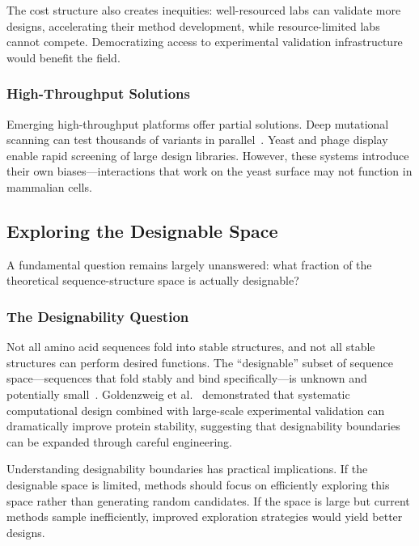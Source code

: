 The cost structure also creates inequities: well-resourced labs can validate more designs, accelerating their method development, while resource-limited labs cannot compete. Democratizing access to experimental validation infrastructure would benefit the field.

\subsubsection{High-Throughput Solutions}

Emerging high-throughput platforms offer partial solutions. Deep mutational scanning can test thousands of variants in parallel~\cite{kewalramani2023state}. Yeast and phage display enable rapid screening of large design libraries. However, these systems introduce their own biases---interactions that work on the yeast surface may not function in mammalian cells.

\subsection{Exploring the Designable Space}
\label{subsec:designability}

A fundamental question remains largely unanswered: what fraction of the theoretical sequence-structure space is actually designable?

\subsubsection{The Designability Question}

Not all amino acid sequences fold into stable structures, and not all stable structures can perform desired functions. The ``designable'' subset of sequence space---sequences that fold stably and bind specifically---is unknown and potentially small~\cite{ingraham2023chroma}. Goldenzweig et al.~\cite{goldenzweig2016protein} demonstrated that systematic computational design combined with large-scale experimental validation can dramatically improve protein stability, suggesting that designability boundaries can be expanded through careful engineering.

Understanding designability boundaries has practical implications. If the designable space is limited, methods should focus on efficiently exploring this space rather than generating random candidates. If the space is large but current methods sample inefficiently, improved exploration strategies would yield better designs.

